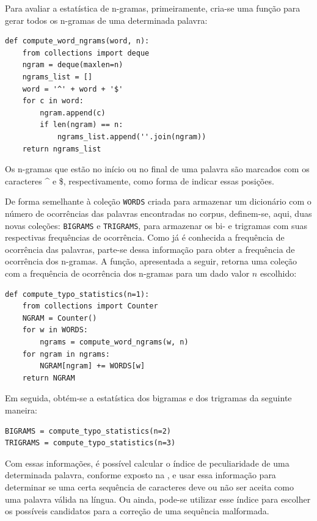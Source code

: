 \documentclass{textolivre}
\begin{document}
Para avaliar a estatística de n-gramas,
primeiramente, cria-se 
uma função para gerar todos os n-gramas de uma determinada palavra:
\begin{lstlisting}[label=lst-ngramfun]
def compute_word_ngrams(word, n):
    from collections import deque
    ngram = deque(maxlen=n)
    ngrams_list = []
    word = '^' + word + '$'
    for c in word:
        ngram.append(c)
        if len(ngram) == n:
            ngrams_list.append(''.join(ngram))
    return ngrams_list
\end{lstlisting}%
Os n-gramas que estão no início ou no
final de uma
palavra são marcados com os caracteres
{\^{}} e \$, respectivamente, como
forma de indicar essas posições.

De forma semelhante à coleção
\texttt{WORDS} criada para armazenar um
dicionário com o número 
de ocorrências das palavras encontradas no corpus, definem-se, aqui, duas novas coleções: \texttt{BIGRAMS}
e \texttt{TRIGRAMS}, para armazenar os bi- e trigramas com suas respectivas frequências de ocorrência.
Como já é conhecida a frequência de
ocorrência das palavras, parte-se
dessa informação 
para obter a frequência de ocorrência dos n-gramas. A função, apresentada a seguir, retorna uma coleção 
com a frequência de ocorrência dos n-gramas para um dado valor $n$
escolhido:
\begin{lstlisting}[label=lst-typo-stat]
def compute_typo_statistics(n=1):
    from collections import Counter
    NGRAM = Counter()
    for w in WORDS:
        ngrams = compute_word_ngrams(w, n)
	for ngram in ngrams:
	    NGRAM[ngram] += WORDS[w]
    return NGRAM
\end{lstlisting}%
Em seguida, obtém-se a estatística dos
bigramas e dos trigramas da seguinte
maneira:
\begin{lstlisting}[label=lst-typo-stat]
BIGRAMS = compute_typo_statistics(n=2)
TRIGRAMS = compute_typo_statistics(n=3)
\end{lstlisting}%

Com essas informações, é possível 
calcular o índice de peculiaridade de
uma determinada palavra, conforme
exposto na
, e usar essa informação
para determinar se uma certa sequência
de caracteres deve ou não ser aceita
como uma palavra válida na língua. Ou ainda,
pode-se utilizar esse índice para escolher os possíveis candidatos para a correção de uma sequência
malformada.

\end{document}
